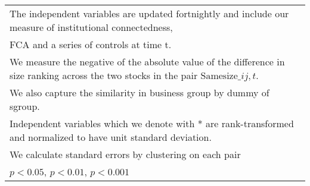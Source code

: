 {\begin{tabular}{l*{7}{c}}
\multicolumn{8}{l}{\footnotesize The independent variables are updated fortnightly and include our measure of institutional connectedness,}\\
\multicolumn{8}{l}{\footnotesize  FCA and a series of controls at time t.}\\
\multicolumn{8}{l}{\footnotesize We measure the negative of the absolute value of the difference in size ranking across the two stocks in the pair $ \text{Samesize}\_{ij,t} $.}\\
\multicolumn{8}{l}{\footnotesize We also capture the similarity in business group by dummy of sgroup.}\\
\multicolumn{8}{l}{\footnotesize Independent variables which  we denote with * are rank-transformed and normalized to have unit standard deviation.}\\
\multicolumn{8}{l}{\footnotesize  We calculate standard errors by clustering on each pair}\\
\multicolumn{8}{l}{\footnotesize \sym{*} \(p<0.05\), \sym{**} \(p<0.01\), \sym{***} \(p<0.001\)}\\
\end{tabular}
}
